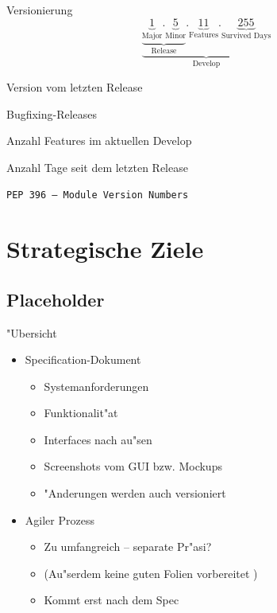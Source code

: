 \documentclass{beamer}
\begin{document}
\begin{frame}{Versionierung}
	\begin{equation*}
		\underbrace{\underbrace{\underbrace{1}_{\text{Major}}.\underbrace{5}_{\text{Minor}}}_{\text{Release}}.\underbrace{11}_{\text{Features}}.\underbrace{255}_{\text{Survived Days}}}_{\text{Develop}}
	\end{equation*}
	\vfill
	\begin{description}
		\item[Major:] Version vom letzten Release
		\item[Minor:] Bugfixing-Releases
		\item[Features:] Anzahl Features im aktuellen Develop
		\item[Survived Days:] Anzahl Tage seit dem letzten Release
		\item[Ansonsten:] \texttt{PEP\,396 -- Module Version Numbers}
	\end{description}
\end{frame}

\section{Strategische Ziele}
\subsection{Placeholder}

\begin{frame}{"Ubersicht}
	\begin{itemize}
		\item Specification-Dokument
			\begin{itemize}
				\item Systemanforderungen
				\item Funktionalit"at
				\item Interfaces nach au"sen
				\item Screenshots vom GUI bzw. Mockups
				\item "Anderungen werden auch versioniert
			\end{itemize}
		\item Agiler Prozess
			\begin{itemize}
				\item Zu umfangreich -- separate Pr"asi?
				\item (Au"serdem keine guten Folien vorbereitet \Sadey)
				\item Kommt erst nach dem Spec
			\end{itemize}
	\end{itemize}
\end{frame}
\end{document}

